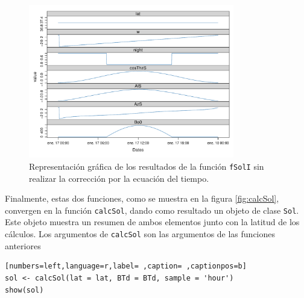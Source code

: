 \begin{figure}[!htb]
\centering
\includegraphics[width=0.8\textwidth]{figuras/codigo-solIEoT.pdf}
\caption{Representación gráfica de los resultados de la función \texttt{fSolI} sin realizar la corrección por la ecuación del tiempo.}
\end{figure}
\FloatBarrier
Finalmente, estas dos funciones, como se muestra en la figura \ref{fig:calcSol}, convergen en la función \texttt{calcSol}, dando como resultado un objeto de clase \texttt{Sol}. Este objeto muestra un resumen de ambos elementos junto con la latitud de los cálculos. Los argumentos de \texttt{calcSol} son las argumentos de las funciones anteriores
\begin{lstlisting}[numbers=left,language=r,label= ,caption= ,captionpos=b]
sol <- calcSol(lat = lat, BTd = BTd, sample = 'hour')
show(sol)
\end{lstlisting}

